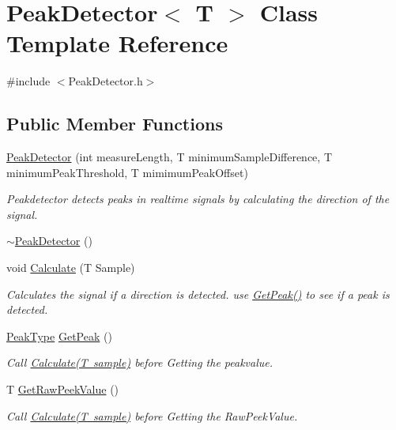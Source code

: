 \hypertarget{class_peak_detector}{}\section{Peak\+Detector$<$ T $>$ Class Template Reference}
\label{class_peak_detector}


{\ttfamily \#include $<$Peak\+Detector.\+h$>$}

\subsection*{Public Member Functions}
\begin{DoxyCompactItemize}
\item 
\mbox{\hyperlink{class_peak_detector_a616829654acf46b8574903d9abcdaf9d}{Peak\+Detector}} (int measure\+Length, T minimum\+Sample\+Difference, T minimum\+Peak\+Threshold, T mimimum\+Peak\+Offset)
\begin{DoxyCompactList}\small\item\em Peakdetector detects peaks in realtime signals by calculating the direction of the signal. \end{DoxyCompactList}\item 
\mbox{\hyperlink{class_peak_detector_a950c3287299cf1352cb7c32de2f54384}{$\sim$\+Peak\+Detector}} ()
\item 
void \mbox{\hyperlink{class_peak_detector_a888b9d29612caf03e7417ab3593f6392}{Calculate}} (T Sample)
\begin{DoxyCompactList}\small\item\em Calculates the signal if a direction is detected. use \mbox{\hyperlink{class_peak_detector_a72f7916aa1d26388c9d70eee1cd5e3bc}{Get\+Peak()}} to see if a peak is detected. \end{DoxyCompactList}\item 
\mbox{\hyperlink{_peak_detector_8h_a4791e14c9f62a95fdf58cd8b41ca6a08}{Peak\+Type}} \mbox{\hyperlink{class_peak_detector_a72f7916aa1d26388c9d70eee1cd5e3bc}{Get\+Peak}} ()
\begin{DoxyCompactList}\small\item\em Call \mbox{\hyperlink{class_peak_detector_a888b9d29612caf03e7417ab3593f6392}{Calculate(\+T sample)}} before Getting the peakvalue. \end{DoxyCompactList}\item 
T \mbox{\hyperlink{class_peak_detector_aebfc5583c4c696119bbe834b1474d896}{Get\+Raw\+Peek\+Value}} ()
\begin{DoxyCompactList}\small\item\em Call \mbox{\hyperlink{class_peak_detector_a888b9d29612caf03e7417ab3593f6392}{Calculate(\+T sample)}} before Getting the Raw\+Peek\+Value. \end{DoxyCompactList}\end{DoxyCompactItemize}


